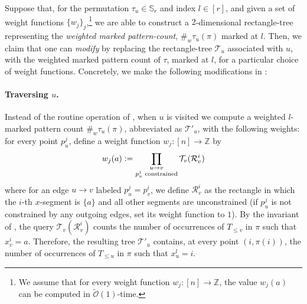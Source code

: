 \documentclass{article}
\newcommand{\ZZ}{\mathbb{Z}}
\newcommand{\pcnw}[2]{{\#_w { #1 } \left( #2 \right)}}
\newcommand{\eqdef}{\vcentcolon=}
\theoremstyle{remark}
\newcommand{\Otilde}[1]{\widetilde{\mathcal{O}}\left( #1 \right)}
\theoremstyle{plain}
\begin{document}
Suppose that, for the permutation $\tau_u \in \mathbb{S}_r$ and index $l \in [r]$,
and given a set of weight functions $\{w_j\}_j$,\footnote{
We assume that for every weight function $w_j: [n] \to \ZZ$, the value $w_j(a)$ can be computed in $\Otilde{1}$-time.}
we are able to construct a $2$-dimensional rectangle-tree
representing the \textit{weighted marked pattern-count}, $\pcnw{\tau_u}{\pi}$ marked at $l$.
Then, we claim that one can \textit{modify}  by
replacing the rectangle-tree $\mathcal{T}_u$ associated with $u$, with the weighted marked pattern count
of $\tau$, marked at $l$, for a particular choice of weight functions.
Concretely, we make the following modifications in : 
 
\paragraph{Traversing $u$.}
Instead of the routine operation of , when $u$ is visited 
we compute a weighted $l$-marked pattern count $\pcnw{\tau_u}{\pi}$, abbreviated as $\mathcal{T}'_u$, with the following weights:
for every point $p_u^j$, define a weight function $w_j: [n] \to \ZZ$ by
\[
w_j(a) \eqdef \prod_{\substack{u\to v \\ \text{$p_u^j$ constrained}}} \mathcal{T}_v({\mathcal{R}}_{v}^{i})
\]
where for an edge $u\to v$ labeled $p_u^j=p_v^i$, we define ${\mathcal{R}}_{v}^{i}$
as the rectangle in which the $i$-th $x$-segment is $\{a\}$ and all other segments are unconstrained
(if $p_u^j$ is not constrained by any outgoing edges, set its weight function to $1$).
By the invariant of ,
the query $\mathcal{T}_v(\mathcal{R}_v^i)$ counts the number of occurrences of $T_{\le v}$ in $\pi$ such that $x_v^i=a$.
Therefore, the resulting tree $\mathcal{T}'_u$ contains, at every point $(i,\pi(i))$,
the number of occurrences of $T_{\le u}$ in $\pi$ such that $x_u^l=i$. 
\end{document}
